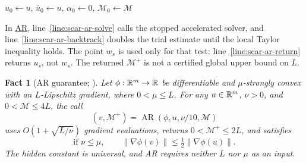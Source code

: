 \documentclass{article}
\newtheorem{fact}{Fact}[section]
\begin{document}
\begin{procedure}[H]
\DontPrintSemicolon
\caption{AR($\phi,u,\alpha,\mathcal M$)}
\label{proc:scar-ar}
$u_0\leftarrow u$, $\bar u_0\leftarrow u$,
 $\alpha_0\leftarrow0$, $\mathcal M_0\leftarrow\mathcal M$\;
\end{procedure}

In \hyperref[proc:scar-ar]{AR}, line~\ref{line:scar-ar-solve}
calls the stopped accelerated solver, and
line~\ref{line:scar-ar-backtrack} doubles the trial estimate until
the local Taylor inequality holds.  The point $w_s$ is used only
for that test: line~\ref{line:scar-ar-return} returns $u_s$, not
$w_s$.  The returned $\mathcal M^+$ is not a certified global
upper bound on $L$.

\begin{samepage}
\begin{fact}[AR guarantee; {\citet[Theorem~4.1 and Algorithm~4.2]{lan2026optimal}}]
\label{thm:scar-blackbox}
Let $\phi:\mathbb{R}^m\to\mathbb{R}$ be differentiable and $\mu$-strongly convex
with an $L$-Lipschitz gradient, where $0<\mu\le L$.
For any $u\in\mathbb{R}^m$, $\nu>0$, and $0<\mathcal M\le4L$, the call
\[
 (v,\mathcal M^+)=\operatorname{AR}(\phi,u,\nu/10,\mathcal M)
\]
uses $O(1+\sqrt{L/\nu})$ gradient evaluations, returns
$0<\mathcal M^+\le2L$, and satisfies
\begin{equation}\label{eq:scar-ar-guarantee}
 \text{if }\nu\le\mu,\qquad
 \|\nabla\phi(v)\|\le\tfrac12\|\nabla\phi(u)\|.
\end{equation}
The hidden constant is universal, and AR requires neither $L$ nor
$\mu$ as an input.
\end{fact}
\end{samepage}
\end{document}
